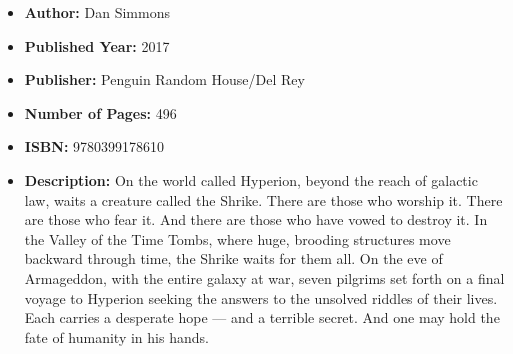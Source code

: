 \documentclass{tufte-handout}
\begin{document}
\begin{itemize}
    \item[] \textbf{Author:} Dan Simmons
    \item[] \textbf{Published Year:} 2017
    \item[] \textbf{Publisher:} Penguin Random House/Del Rey
    \item[] \textbf{Number of Pages:} 496      
    \item[] \textbf{ISBN:} 9780399178610
    \item[] \textbf{Description:} On the world called Hyperion, beyond the reach of galactic law, waits a creature called the Shrike. There are those who worship it. There are those who fear it. And there are those who have vowed to destroy it. In the Valley of the Time Tombs, where huge, brooding structures move backward through time, the Shrike waits for them all. On the eve of Armageddon, with the entire galaxy at war, seven pilgrims set forth on a final voyage to Hyperion seeking the answers to the unsolved riddles of their lives. Each carries a desperate hope --- and a terrible secret. And one may hold the fate of humanity in his hands.
\end{itemize}
\end{document}

